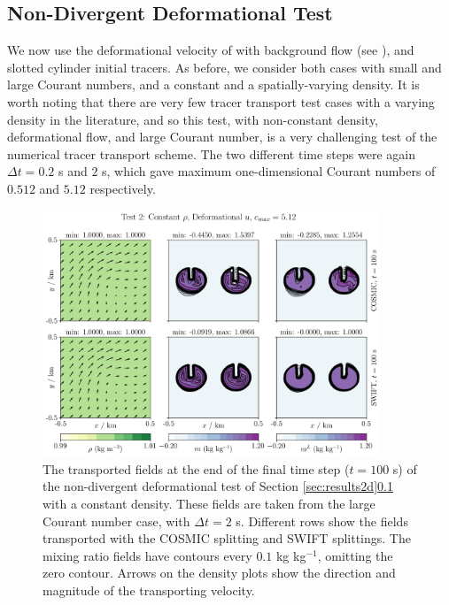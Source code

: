 \documentclass{ametsocV6.1}
\begin{document}
\subsection{Non-Divergent Deformational Test} \label{sec:test2}
We now use the deformational velocity of \cite{skamarock2006limiters} with background flow (see \citet{kent2020positive}), and slotted cylinder initial tracers. As before, we consider both cases with small and large Courant numbers, and a constant and a spatially-varying density. It is worth noting that there are very few tracer transport test cases with a varying density in the literature, and so this test, with non-constant density, deformational flow, and large Courant number, is a very challenging test of the numerical tracer transport scheme. 
The two different time steps were again $\Delta t=0.2$ s and $2$ s, which gave maximum one-dimensional Courant numbers of $0.512$ and $5.12$ respectively. \\
\begin{figure}[ht!]
\centering
\includegraphics[width=0.9\textwidth]{fig_3_deformational.jpg}
\caption{The transported fields at the end of the final time step ($t=100$ s) of the non-divergent deformational test of Section \ref{sec:results2d}\ref{sec:test2} with a constant density. These fields are taken from the large Courant number case, with $\Delta t=2$ s. Different rows show the fields transported with the COSMIC splitting and SWIFT splittings.
The mixing ratio fields have contours every $0.1$ kg kg$^{-1}$, omitting the zero contour.
Arrows on the density plots show the direction and magnitude of the transporting velocity.}\label{fig:test2constrho}
\end{figure} \\
\end{document}
